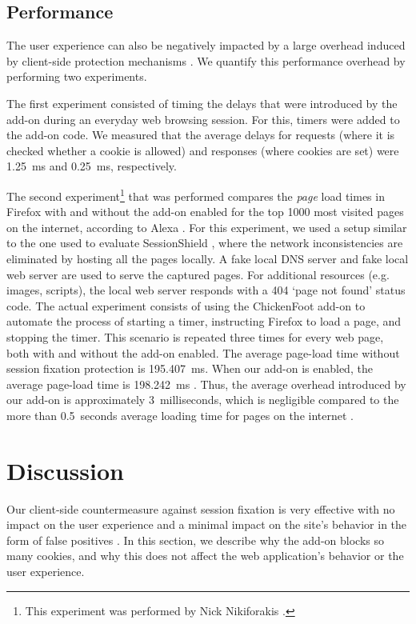 \subsection{Performance}\label{performance}

The user experience can also be negatively impacted by a large overhead induced by client-side protection mechanisms \cite{Bonne2011}. We quantify this performance overhead by performing two experiments.

The first experiment consisted of timing the delays that were introduced by the add-on during an everyday web browsing session. For this, timers were added to the add-on code. We measured that the average delays for requests (where it is checked whether a cookie is allowed) and responses (where cookies are set) were 1.25\ ms and 0.25\ ms, respectively.

The second experiment\footnote{This experiment was performed by Nick Nikiforakis \cite{Bonne2011}.} that was performed compares the \emph{page} load times in Firefox with and without the add-on enabled for the top 1000 most visited pages on the internet, according to Alexa \cite{Alexa1000}. For this experiment, we used a setup similar to the one used to evaluate SessionShield \cite{Nikiforakis2010}, where the network inconsistencies are eliminated by hosting all the pages locally. A fake local DNS server and fake local web server are used to serve the captured pages. For additional resources (e.g. images, scripts), the local web server responds with a 404 `page not found' status code. The actual experiment consists of using the ChickenFoot add-on \cite{ChickenFoot} to automate the process of starting a timer, instructing Firefox to load a page, and stopping the timer. This scenario is repeated three times for every web page, both with and without the add-on enabled. The average page-load time without session fixation protection is 195.407\ ms. When our add-on is enabled, the average page-load time is 198.242\ ms \cite{Bonne2011}. Thus, the average overhead introduced by our add-on is approximately 3\ milliseconds, which is negligible compared to the more than 0.5\ seconds average loading time for pages on the internet \cite{Webmetrics}.

\section{Discussion}\label{discussion}

Our client-side countermeasure against session fixation is very effective with no impact on the user experience and a minimal impact on the site's behavior in the form of false positives \cite{Bonne2011}. In this section, we describe why the add-on blocks so many cookies, and why this does not affect the web application's behavior or the user experience.

